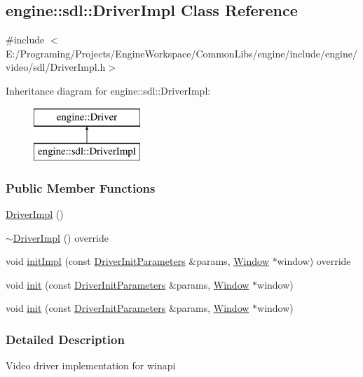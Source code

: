 \hypertarget{a00026}{}\subsection{engine\+:\+:sdl\+:\+:Driver\+Impl Class Reference}
\label{a00026}


{\ttfamily \#include $<$E\+:/\+Programing/\+Projects/\+Engine\+Workspace/\+Common\+Libs/engine/include/engine/video/sdl/\+Driver\+Impl.\+h$>$}

Inheritance diagram for engine\+:\+:sdl\+:\+:Driver\+Impl\+:\begin{figure}[H]
\begin{center}
\leavevmode
\includegraphics[height=2.000000cm]{a00026}
\end{center}
\end{figure}
\subsubsection*{Public Member Functions}
\begin{DoxyCompactItemize}
\item 
\hyperlink{a00026_a0a1b946eea9e2d648d98be26caeb2c60}{Driver\+Impl} ()
\item 
\hyperlink{a00026_afc245b5c1c99e8b5d73e14c52239e319}{$\sim$\+Driver\+Impl} () override
\item 
void \hyperlink{a00026_a831cf6d2ef096f515727d23f19ab9d41}{init\+Impl} (const \hyperlink{a00028}{Driver\+Init\+Parameters} \&params, \hyperlink{a00082}{Window} $\ast$window) override
\item 
void \hyperlink{a00024_a4e283b1274b6ffea595cb7329b09c16d}{init} (const \hyperlink{a00028}{Driver\+Init\+Parameters} \&params, \hyperlink{a00082}{Window} $\ast$window)
\item 
void \hyperlink{a00024_a4e283b1274b6ffea595cb7329b09c16d}{init} (const \hyperlink{a00028}{Driver\+Init\+Parameters} \&params, \hyperlink{a00082}{Window} $\ast$window)
\end{DoxyCompactItemize}


\subsubsection{Detailed Description}
Video driver implementation for winapi 

